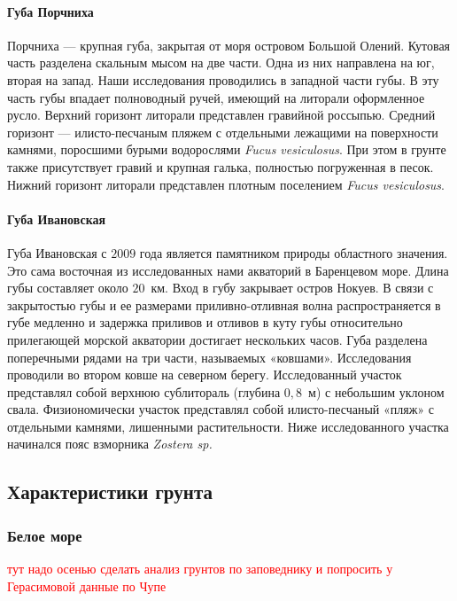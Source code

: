    \paragraph{Губа Порчниха}
Порчниха  ---  крупная   губа,   закрытая   от   моря   островом   Большой   Олений.   
Кутовая часть разделена скальным мысом на две части. 
Одна из них направлена на юг, вторая на запад. 
Наши   исследования   проводились   в   западной   части   губы.   
В   эту   часть   губы   впадает полноводный ручей, имеющий на литорали оформленное русло. 
Верхний горизонт литорали представлен   гравийной   россыпью.   
Средний   горизонт   ---   илисто-песчаным   пляжем   с отдельными   лежащими   на   поверхности   камнями,   поросшими   бурыми   водорослями  {\it Fucus vesiculosus}.   
При   этом   в   грунте   также   присутствует   гравий   и   крупная   галька,   полностью погруженная в песок. 
Нижний горизонт литорали представлен плотным поселением   {\it Fucus  vesiculosus}.

    \paragraph{Губа Ивановская}
Губа Ивановская с $2009$ года является памятником природы областного значения. 
Это сама восточная из исследованных нами акваторий в Баренцевом море. 
Длина губы составляет около $20$~км. 
Вход в губу закрывает  остров Нокуев.
В связи с  закрытостью губы и ее размерами приливно-отливная волна   распространяется   в   губе   медленно   и   задержка   приливов   и   отливов   в   куту   губы относительно прилегающей морской акватории достигает нескольких часов. 
Губа   разделена   поперечными   рядами   на   три   части,   называемых   «ковшами». 
Исследования   проводили   во   втором   ковше   на   северном   берегу.   
Исследованный   участок представлял   собой   верхнюю   сублитораль   (глубина   $0,8$~м)   с   небольшим   уклоном   свала. 
Физиономически участок представлял собой илисто-песчаный «пляж» с отдельными камнями, лишенными растительности. 
Ниже исследованного участка начинался пояс взморника {\it Zostera  sp.} 

        \subsection{Характеристики грунта}

            \subsubsection{Белое море}
\textcolor{red}{тут надо осенью сделать анализ грунтов по заповеднику и попросить у Герасимовой данные по Чупе}


